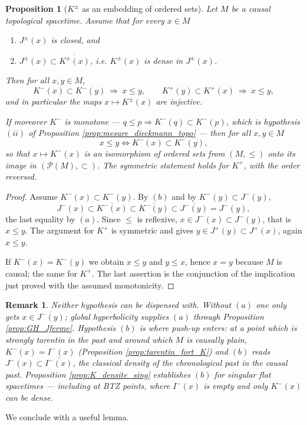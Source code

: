 \documentclass[a4paper,twoside]{article}
\newtheorem{prop}[lem]{Proposition}
\newtheorem{rem}[lem]{Remark}
\begin{document}
\begin{prop}[$K^\pm$ as an embedding of ordered sets]\label{prop:K_plongement_ordre}
Let $M$ be a causal topological spacetime. Assume that for every $x\in M$
\begin{enumerate}[label=(\alph*)]
\item $J^\pm(x)$ is closed, and
\item $J^\pm(x)\subset \overline{K^\pm(x)}$, i.e. $K^\pm(x)$ is dense in $J^\pm(x)$.
\end{enumerate}
Then for all $x,y\in M$,
$$K^-(x)\subset K^-(y)\ \Longrightarrow\ x\leq y, \qquad K^+(y)\subset K^+(x)\ \Longrightarrow\ x\leq y,$$
and in particular the maps $x\mapsto K^\pm(x)$ are injective.

If moreover $K^-$ is monotone --- $q\leq p \Rightarrow K^-(q)\subset K^-(p)$, which is hypothesis
$(ii)$ of Proposition \ref{prop:mesure_dieckmann_topo} --- then for all $x,y\in M$
$$x\leq y \iff K^-(x)\subset K^-(y),$$
so that $x\mapsto K^-(x)$ is an isomorphism of ordered sets from $(M,\leq)$ onto its image in
$\left(\mathcal P(M),\subset\right)$. The symmetric statement holds for $K^+$, with the order
reversed.
\end{prop}
\begin{proof}
Assume $K^-(x)\subset K^-(y)$. By $(b)$ and by $K^-(y)\subset J^-(y)$,
$$J^-(x)\subset \overline{K^-(x)}\subset \overline{K^-(y)}\subset \overline{J^-(y)}=J^-(y),$$
the last equality by $(a)$. Since $\leq$ is reflexive, $x\in J^-(x)\subset J^-(y)$, that is $x\leq y$.
The argument for $K^+$ is symmetric and gives $y\in J^+(y)\subset J^+(x)$, again $x\leq y$.

If $K^-(x)=K^-(y)$ we obtain $x\leq y$ and $y\leq x$, hence $x=y$ because $M$ is causal; the same
for $K^+$. The last assertion is the conjunction of the implication just proved with the assumed
monotonicity.
\end{proof}

\begin{rem}\label{rem:K_plongement_hypotheses}
Neither hypothesis can be dispensed with. Without $(a)$ one only gets $x\in \overline{J^-(y)}$; global
hyperbolicity supplies $(a)$ through Proposition \ref{prop:GH_Jferme}. Hypothesis $(b)$ is where
push-up enters: at a point which is strongly tarentin in the past and around which $M$ is causally
plain, $K^-(x)=I^-(x)$ (Proposition \ref{prop:tarentin_fort_K}) and $(b)$ reads
$J^-(x)\subset\overline{I^-(x)}$, the classical density of the chronological past in the causal past.
Proposition \ref{prop:K_densite_sing} establishes $(b)$ for singular flat spacetimes --- including at
BTZ points, where $I^-(x)$ is empty and only $K^-(x)$ can be dense.
\end{rem}
We conclude with a useful lemma.
\end{document}
